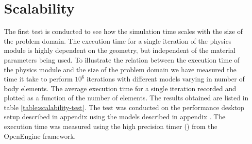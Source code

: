 \section{Scalability}
\label{sec:time-as-a-function-of-geometry}
The first test is conducted to see how the simulation time scales with
the size of the problem domain. 
%
The execution time for a single iteration of the physics module is
highly dependent on the geometry, but independent of the
material parameters being used.
%
%
%
To illustrate the relation between the execution time of the physics
module and the size of the problem domain we have measured the time
it take to perform $10^6$ iterations with different models varying in
number of body elements. The average execution time for a single
iteration recorded and plotted as a function of the number of
elements.
% 
The results obtained are listed
in table \vref{table:scalability-test}. The test was conducted on the
performance desktop setup described in appendix
 using the models described
in appendix .
The execution time was measured using the high precision timer
() from the OpenEngine framework.

\layoutnewpage

